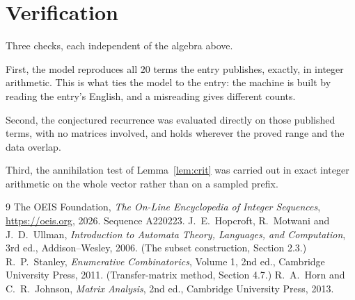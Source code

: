 \documentclass[11pt,a4paper]{article}
\theoremstyle{plain}
\theoremstyle{definition}
\begin{document}
\section{Verification}

Three checks, each independent of the algebra above.

First, the model reproduces all $20$ terms the entry publishes, exactly, in integer
arithmetic. This is what ties the model to the entry: the machine is built by reading the
entry's English, and a misreading gives different counts.

Second, the conjectured recurrence was evaluated directly on those published terms, with no
matrices involved, and holds wherever the proved range and the data overlap.

Third, the annihilation test of Lemma~\ref{lem:crit} was carried out in exact integer
arithmetic on the whole vector rather than on a sampled prefix.

\begin{thebibliography}{9}
 The OEIS Foundation, \emph{The On-Line Encyclopedia of Integer
Sequences}, \url{https://oeis.org}, 2026. Sequence A220223.
 J.~E.~Hopcroft, R.~Motwani and J.~D.~Ullman, \emph{Introduction to Automata
Theory, Languages, and Computation}, 3rd ed., Addison--Wesley, 2006. (The subset
construction, Section 2.3.)
 R.~P.~Stanley, \emph{Enumerative Combinatorics}, Volume 1, 2nd ed.,
Cambridge University Press, 2011. (Transfer-matrix method, Section 4.7.)
 R.~A.~Horn and C.~R.~Johnson, \emph{Matrix Analysis}, 2nd ed., Cambridge
University Press, 2013.
\end{thebibliography}
\end{document}
